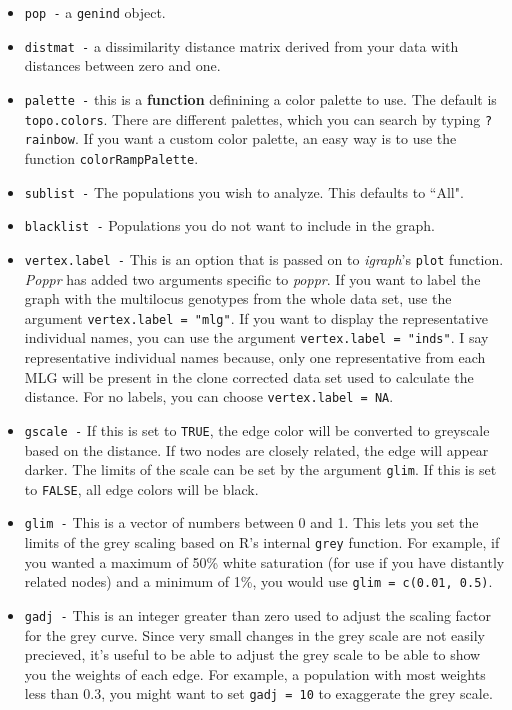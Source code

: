 \documentclass[letterpaper]{article}\usepackage[]{graphicx}\usepackage[]{color}
\begin{document}
\begin{itemize}
  \item \texttt{pop -} a \texttt{genind} object.
  \item \texttt{distmat -} a dissimilarity distance matrix derived from your data with distances between zero and one.
  \item \texttt{palette -} this is a \textbf{function} definining a color palette to use. The default is \texttt{topo.colors}. There are different palettes, which you can search by typing \texttt{?rainbow}. If you want a custom color palette, an easy way is to use the function \texttt{colorRampPalette}.
  \item \texttt{sublist -} The populations you wish to analyze. This defaults to ``All".
  \item \texttt{blacklist -} Populations you do not want to include in the graph.
  \item \texttt{vertex.label -} This is an option that is passed on to \textit{igraph}'s \texttt{plot} function. \textit{Poppr} has added two arguments specific to \textit{poppr}. If you want to label the graph with the multilocus genotypes from the whole data set, use the argument \texttt{vertex.label = "mlg"}. If you want to display the representative individual names, you can use the argument \texttt{vertex.label = "inds"}. I say representative individual names because, only one representative from each MLG will be present in the clone corrected data set used to calculate the distance. For no labels, you can choose \texttt{vertex.label = NA}. 
  \item \texttt{gscale -} If this is set to \texttt{TRUE}, the edge color will be converted to greyscale based on the distance. If two nodes are closely related, the edge will appear darker. The limits of the scale can be set by the argument \texttt{glim}. If this is set to \texttt{FALSE}, all edge colors will be black. 
  \item \texttt{glim -} This is a vector of numbers between 0 and 1. This lets you set the limits of the grey scaling based on R's internal \texttt{grey} function. For example, if you wanted a maximum of 50\% white saturation (for use if you have distantly related nodes) and a minimum of 1\%, you would use \texttt{glim = c(0.01, 0.5)}. 
  \item \texttt{gadj -} This is an integer greater than zero used to adjust the scaling factor for the grey curve. Since very small changes in the grey scale are not easily precieved, it's useful to be able to adjust the grey scale to be able to show you the weights of each edge. For example, a population with most weights less than 0.3, you might want to set \texttt{gadj = 10} to exaggerate the grey scale. 

\end{itemize}
\end{document}
